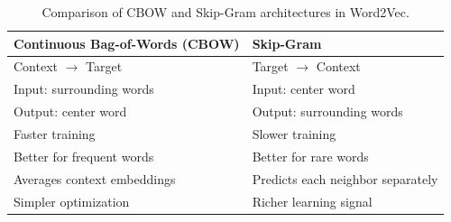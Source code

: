 \begin{table}[!htp]
    \centering
    \begin{tabular}{@{} l l @{}}
        \toprule
        \textbf{Continuous Bag-of-Words (CBOW)} & \textbf{Skip-Gram} \\
        \midrule
        Context $\to$ Target        & Target $\to$ Context \\
        Input: surrounding words    & Input: center word \\
        Output: center word         & Output: surrounding words \\
        Faster training             & Slower training \\
        Better for frequent words   & Better for rare words \\
        Averages context embeddings & Predicts each neighbor separately \\
        Simpler optimization        & Richer learning signal \\
        \bottomrule
    \end{tabular}
    \caption{Comparison of CBOW and Skip-Gram architectures in Word2Vec.}
    \label{tab:cbow-vs-skipgram}
\end{table}